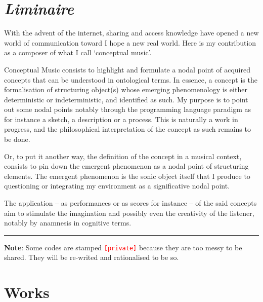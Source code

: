 \chapter*{\textsl{Liminaire}}

\thispagestyle{empty}

\bigskip

With the advent of the internet, sharing and access knowledge have opened a new world of communication toward I hope a new real world. Here is my contribution as a composer of what I call `conceptual music'.						
\bigskip

Conceptual Music consists to highlight and formulate a nodal point of acquired concepts that can be understood in ontological terms. In essence, a concept is the formalisation of structuring object(s) whose emerging phenomenology is either deterministic or indeterministic, and identified as such. My purpose is to point out some nodal points notably through the programming language paradigm as for instance a sketch, a description or a process. This is naturally a work in progress, and the philosophical interpretation of the concept as such remains to be done.						

Or, to put it another way, the definition of the concept in a musical context, consists to pin down the emergent phenomenon as a nodal point of structuring elements. The emergent phenomenon is the sonic object itself that I produce to questioning or integrating my environment as a significative nodal point.

\bigskip
 
The application -- as performances or as scores for instance -- of the said concepts aim to stimulate the imagination and possibly even the creativity of the listener, notably by anamnesis in cognitive terms.										

\bigskip

\begin{center}\rule{0.5\linewidth}{0.5pt}\end{center}

\bigskip
\bigskip

\textbf{Note}: Some codes are stamped \texttt{\textcolor{red}{\small[private]}} because they are too messy to be shared. They will be re-writed and rationalised to be so.

\chapter*{Works}

